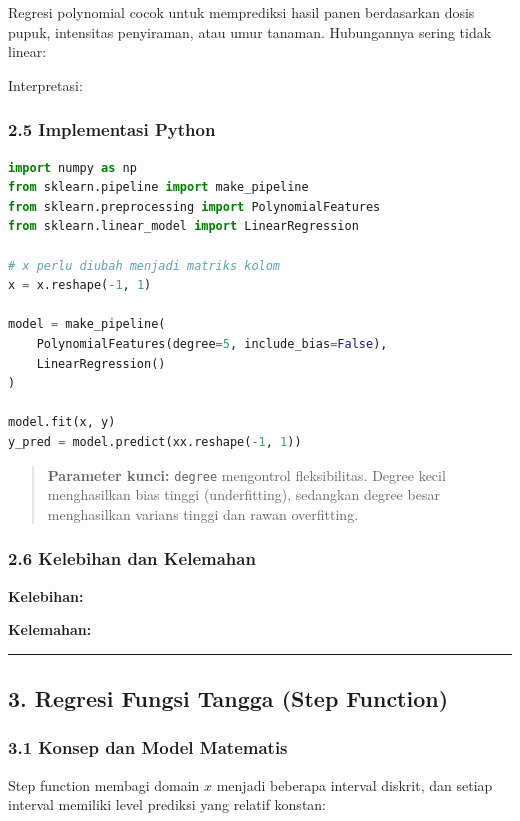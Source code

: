 \documentclass[12pt,a4paper]{article}
\begin{document}
Regresi polynomial cocok untuk memprediksi hasil panen berdasarkan dosis pupuk, intensitas penyiraman, atau umur tanaman. Hubungannya sering tidak linear:



Interpretasi:


\subsubsection{2.5 Implementasi Python}

\begin{lstlisting}[language=Python]
import numpy as np
from sklearn.pipeline import make_pipeline
from sklearn.preprocessing import PolynomialFeatures
from sklearn.linear_model import LinearRegression

# x perlu diubah menjadi matriks kolom
x = x.reshape(-1, 1)

model = make_pipeline(
    PolynomialFeatures(degree=5, include_bias=False),
    LinearRegression()
)

model.fit(x, y)
y_pred = model.predict(xx.reshape(-1, 1))
\end{lstlisting}

\begin{quote}
\textbf{Parameter kunci:} \texttt{degree} mengontrol fleksibilitas. Degree kecil menghasilkan bias tinggi (underfitting), sedangkan degree besar menghasilkan varians tinggi dan rawan overfitting.\end{quote}


\subsubsection{2.6 Kelebihan dan Kelemahan}

\textbf{Kelebihan:}


\textbf{Kelemahan:}


\hrule


\subsection{3. Regresi Fungsi Tangga (Step Function)}

\subsubsection{3.1 Konsep dan Model Matematis}

Step function membagi domain $x$ menjadi beberapa interval diskrit, dan setiap interval memiliki level prediksi yang relatif konstan:
\end{document}
